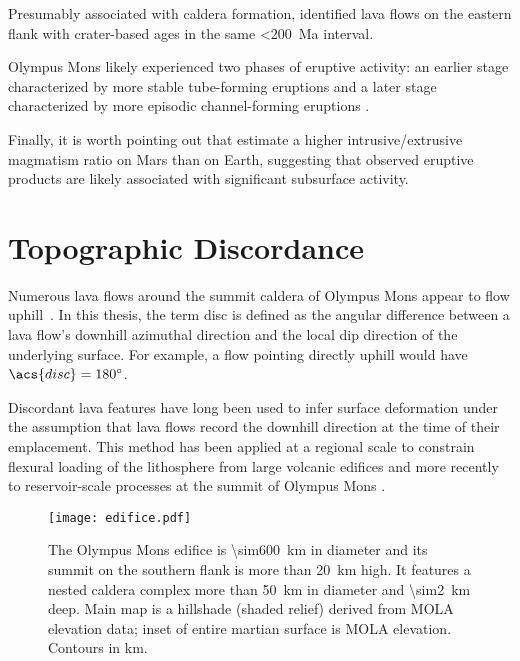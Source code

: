 Presumably associated with caldera formation, \textcite{basilevsky_geologically_2006} identified lava flows on the eastern flank with crater-based ages in the same \qty{<200}{Ma} interval.

Olympus Mons likely experienced two phases of eruptive activity: an earlier stage characterized by more stable tube-forming eruptions and a later stage characterized by more episodic channel-forming eruptions \parencite{bleacher_olympus_2007,peters_flank_2017}. 

Finally, it is worth pointing out that \textcite[e.g.,][]{black_eruptibility_2016} estimate a higher intrusive/extrusive magmatism ratio on Mars than on Earth, suggesting that observed eruptive products are likely associated with significant subsurface activity. 

\section{Topographic Discordance}

Numerous lava flows around the summit caldera of Olympus Mons appear to flow uphill~\parencite[Figure~\ref{fig:uphill-flows}; after][]{mouginis-mark_late-stage_2019}. In this thesis, the term \ac{disc} is defined as the angular difference between a lava flow's downhill azimuthal direction and the local dip direction of the underlying surface. For example, a flow pointing directly uphill would have $\acs{disc}=\ang{180}$. 

Discordant lava features have long been used to infer surface deformation under the assumption that lava flows record the downhill direction at the time of their emplacement. This method has been applied at a regional scale to constrain flexural loading of the lithosphere from large volcanic edifices \parencite{mouginis-mark_ancient_1982,isherwood_volcanic_2013,chadwick_late_2015} and more recently to reservoir-scale processes at the summit of Olympus Mons \parencite{mouginis-mark_late-stage_2019}.

\begin{figure}
    \centering
    \texttt{[image: edifice.pdf]}
    \caption[Olympus Mons]{The Olympus Mons edifice is \qty{\sim600}{\km} in diameter and its summit on the southern flank is more than \qty{20}{\km} high. It features a nested caldera complex more than \qty{50}{\km} in diameter and \qty{\sim2}{\km} deep. Main map is a hillshade (shaded relief) derived from \acs{MOLA} elevation data; inset of entire martian surface is \acs{MOLA} elevation. Contours in \unit{\km}.}\label{fig:edifice}
\end{figure}

